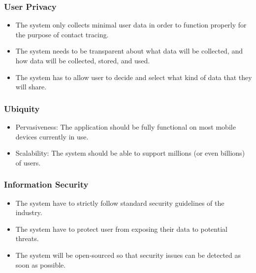     \subsubsection{User Privacy}
      \begin{itemize}
        \item The system only collects minimal user data in order to function properly for the purpose of contact tracing.
        \item The system needs to be transparent about what data will be collected, and how data will be collected, stored, and used.
        \item The system has to allow user to decide and select what kind of data that they will share.
      \end{itemize}
    
    \subsubsection{Ubiquity}
      \begin{itemize}
        \item Pervasiveness: The application should be fully functional on most mobile devices currently in use.
        \item Scalability: The system should be able to support millions (or even billions) of users.
      \end{itemize}
    
    \subsubsection{Information Security}
      \begin{itemize}
        \item The system have to strictly follow standard security guidelines of the industry.
        \item The system have to protect user from exposing their data to potential threats.
        \item The system will be open-sourced so that security issues can be detected as soon as possible.
      \end{itemize}